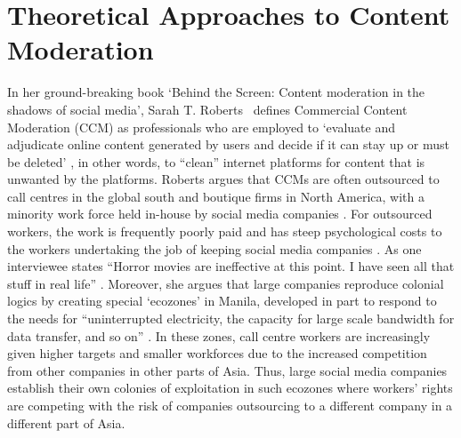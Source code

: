 
\section{Theoretical Approaches to Content Moderation}
In her ground-breaking book `Behind the Screen: Content moderation in the shadows of social media', Sarah T. Roberts~\citeyearpar{Roberts:2019} defines Commercial Content Moderation (CCM) as professionals who are employed to `evaluate and adjudicate online content generated by users and decide if it can stay up or must be deleted' \citep[p. 1]{Roberts:2019}, in other words, to ``clean'' internet platforms for content that is unwanted by the platforms.
Roberts argues that CCMs are often outsourced to call centres in the global south and boutique firms in North America, with a minority work force held in-house by social media companies \citep{Roberts:2019}.
For outsourced workers, the work is frequently poorly paid and has steep psychological costs to the workers undertaking the job of keeping social media companies .
As one interviewee states ``Horror movies are ineffective at this point.
I have seen all that stuff in real life'' \citep[p. 122]{Roberts:2019}.
Moreover, she argues that large companies reproduce colonial logics by creating special `ecozones' in Manila, developed in part to respond to the needs for ``uninterrupted electricity, the capacity for large scale bandwidth for data transfer, and so on'' \citep[p. 183]{Roberts:2019}.
In these zones, call centre workers are increasingly given higher targets and smaller workforces \citep[p. 178]{Roberts:2019} due to the increased competition from other companies in other parts of Asia.
Thus, large social media companies establish their own colonies of exploitation in such ecozones where workers' rights are competing with the risk of companies outsourcing to a different company in a different part of Asia.

